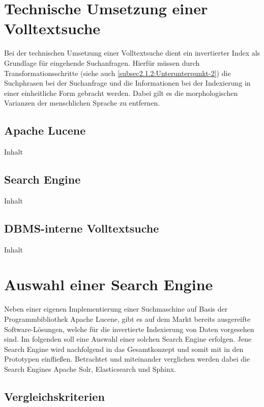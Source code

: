 \section{Technische Umsetzung einer Volltextsuche\label{sec4.1:Unterpunkt-1}}

Bei der technischen Umsetzung einer Volltextsuche dient ein invertierter Index als Grundlage für eingehende Suchanfragen. Hierfür müssen durch Transformationsschritte (siehe auch \autoref{subsec2.1.2:Unterunterpunkt-2}) die Suchphrasen bei der Suchanfrage und die Informationen bei der Indexierung in einer einheitliche Form gebracht werden. Dabei gilt es die morphologischen Varianzen der menschlichen Sprache zu entfernen.

\subsection{Apache Lucene\label{subsec4.1.1:Unterunterpunkt-1}}

Inhalt

\subsection{Search Engine\label{subsec4.1.2:Unterunterpunkt-2}}

Inhalt

\subsection{DBMS-interne Volltextsuche\label{subsec4.1.3:Unterunterpunkt-3}}

Inhalt

\section{Auswahl einer Search Engine\label{sec4.2:Unterpunkt-2}}

Neben einer eigenen Implementierung einer Suchmaschine auf Basis der Programmbibliothek \glqq Apache Lucene\grqq{}, gibt es auf dem Markt bereits ausgereifte Software-Lösungen, welche für die invertierte Indexierung von Daten vorgesehen sind. Im folgenden soll eine Auswahl einer solchen Search Engine erfolgen. Jene Search Engine wird nachfolgend in das Gesamtkonzept und somit mit in den Prototypen einfließen. Betrachtet und miteinander verglichen werden dabei die Search Engines \glqq Apache Solr\grqq{}, \glqq Elasticsearch\grqq{} und \glqq Sphinx\grqq{}.

\subsection{Vergleichskriterien\label{subsec4.2.1:Unterunterpunkt-1}}

